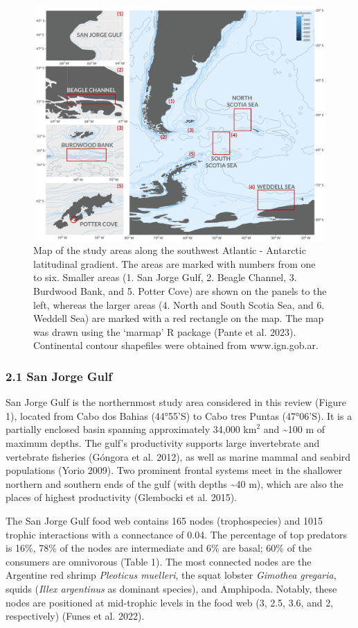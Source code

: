 \documentclass[
]{article}
\begin{document}
\begin{figure}
\centering
\includegraphics[width=6.27in,height=3.528in]{Figures/Map_final.jpg}
\caption{Map of the study areas along the southwest Atlantic - Antarctic
latitudinal gradient. The areas are marked with numbers from one to six.
Smaller areas (1. San Jorge Gulf, 2. Beagle Channel, 3. Burdwood Bank,
and 5. Potter Cove) are shown on the panels to the left, whereas the
larger areas (4. North and South Scotia Sea, and 6. Weddell Sea) are
marked with a red rectangle on the map. The map was drawn using the
`marmap' R package (Pante et al. 2023). Continental contour shapefiles
were obtained from www.ign.gob.ar.}
\end{figure}

\subsubsection{2.1 San Jorge Gulf}\label{san-jorge-gulf}

San Jorge Gulf is the northernmost study area considered in this review
(Figure 1), located from Cabo dos Bahias (44°55'S) to Cabo tres Puntas
(47°06'S). It is a partially enclosed basin spanning approximately
34,000 \(\text{km}^2\) and \textasciitilde100 m of maximum depths. The
gulf's productivity supports large invertebrate and vertebrate fisheries
(Góngora et al. 2012), as well as marine mammal and seabird populations
(Yorio 2009). Two prominent frontal systems meet in the shallower
northern and southern ends of the gulf (with depths \textasciitilde40
m), which are also the places of highest productivity (Glembocki et al.
2015).

The San Jorge Gulf food web contains 165 nodes (trophospecies) and 1015
trophic interactions with a connectance of 0.04. The percentage of top
predators is 16\%, 78\% of the nodes are intermediate and 6\% are basal;
60\% of the consumers are omnivorous (Table 1). The most connected nodes
are the Argentine red shrimp \emph{Pleoticus muelleri}, the squat
lobster \emph{Gimothea gregaria}, squids (\emph{Illex argentinus} as
dominant species), and Amphipoda. Notably, these nodes are positioned at
mid-trophic levels in the food web (3, 2.5, 3.6, and 2, respectively)
(Funes et al. 2022).
\end{document}

